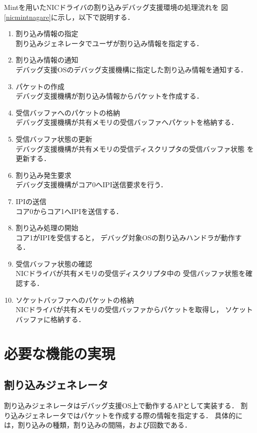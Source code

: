 \documentclass[tanilab-enum]{graduate}
\begin{document}
Mintを用いたNICドライバの割り込みデバッグ支援環境の処理流れを
図\ref{nicmintnagare}に示し，以下で説明する．
\begin{enumerate}
    \item 割り込み情報の指定\\
        割り込みジェネレータでユーザが割り込み情報を指定する．
    \item 割り込み情報の通知\\
        デバッグ支援OSのデバッグ支援機構に指定した割り込み情報を通知する．
    \item パケットの作成\\
        デバッグ支援機構が割り込み情報からパケットを作成する．
    \item 受信バッファへのパケットの格納\\
        デバッグ支援機構が共有メモリの受信バッファへパケットを格納する．
    \item 受信バッファ状態の更新\\
        デバッグ支援機構が共有メモリの受信ディスクリプタの受信バッファ状態
        を更新する．
    \item 割り込み発生要求\\
        デバッグ支援機構がコア0へIPI送信要求を行う．
    \item IPIの送信\\
        コア0からコア1へIPIを送信する．
    \item 割り込み処理の開始\\
        コア1がIPIを受信すると，
        デバッグ対象OSの割り込みハンドラが動作する．
    \item 受信バッファ状態の確認\\
        NICドライバが共有メモリの受信ディスクリプタ中の
        受信バッファ状態を確認する．
    \item ソケットバッファへのパケットの格納\\
        NICドライバが共有メモリの受信バッファからパケットを取得し，
        ソケットバッファに格納する．
\end{enumerate}

\section{必要な機能の実現}
\subsection{割り込みジェネレータ}
割り込みジェネレータはデバッグ支援OS上で動作するAPとして実装する．
割り込みジェネレータではパケットを作成する際の情報を指定する．
具体的には，割り込みの種類，割り込みの間隔，および回数である．
\end{document}

